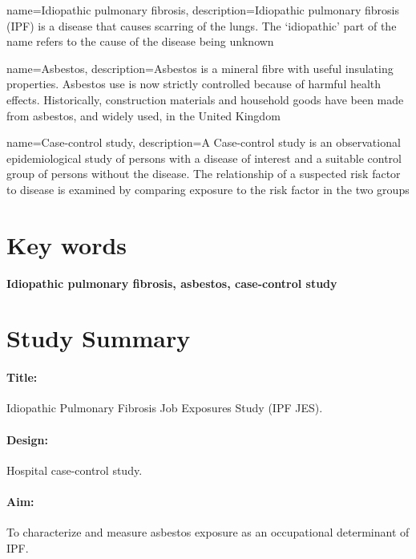 \documentclass[a4paper,10pt]{article}
\begin{document}
\newpage

\tableofcontents

\newpage

  {name=Idiopathic pulmonary fibrosis,
  description={Idiopathic pulmonary fibrosis (IPF) is a disease that causes scarring of the lungs. The `idiopathic' part of the name refers to the cause of the disease being unknown}}


{name=Asbestos,
 description={Asbestos is a mineral fibre with useful insulating properties. Asbestos use is now strictly controlled because of harmful health effects. Historically, construction materials and household goods have been made from asbestos, and widely used, in the United Kingdom}}

{name=Case-control study,
 description={A Case-control study is an observational epidemiological study of persons with a disease of interest and a suitable control group of persons without the disease. The relationship of a suspected risk factor to disease is examined by comparing exposure to the risk factor in the two groups}}


\glsaddall

\printglossary[nonumberlist]

\section*{Key words}

\textbf{Idiopathic pulmonary fibrosis, asbestos, case-control study}

\newpage

\section*{Study Summary}

\paragraph{Title:} Idiopathic Pulmonary Fibrosis Job Exposures Study (IPF JES).
\paragraph{Design:} Hospital case-control study.
\paragraph{Aim:} To characterize and measure asbestos exposure as an occupational determinant of IPF.
\end{document}
